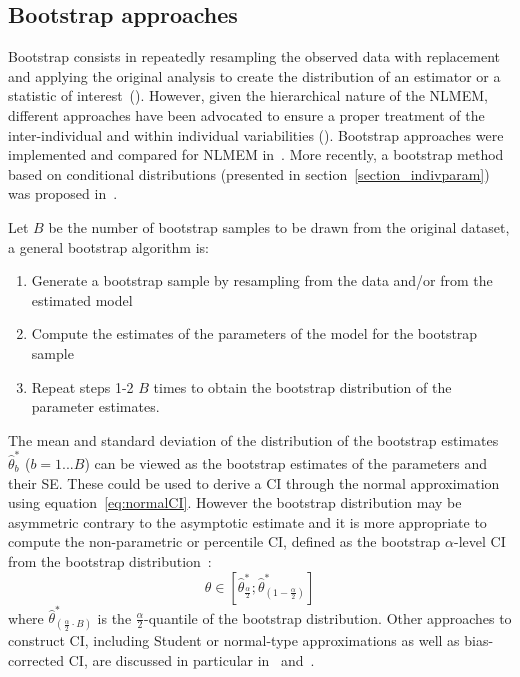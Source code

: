 \subsection{Bootstrap approaches} \label{sec:bootstrap} 

Bootstrap consists in repeatedly resampling the observed data with replacement and applying the original analysis to create the distribution of an estimator or a statistic of interest~(\cite{Efron79}). However, given the hierarchical nature of the NLMEM, different approaches have been advocated to ensure a proper treatment of the inter-individual and within individual variabilities (\cite{Das99}). Bootstrap approaches were implemented and compared for NLMEM in~\cite{Thai13}. More recently, a bootstrap method based on conditional distributions  (presented in section~\ref{section_indivparam}) was proposed in~\cite{Comets21bootstrap}.

Let $B$ be the number of bootstrap samples to be drawn from the original dataset, a general bootstrap algorithm is:
\begin{enumerate}
  \item Generate a bootstrap sample by resampling from the data and/or from the estimated model
  \item Compute the estimates of the parameters of the model for the bootstrap sample
  \item Repeat steps 1-2 $B$ times to obtain the bootstrap distribution of the parameter estimates.
\end{enumerate}
The mean and standard deviation of the distribution of the bootstrap estimates $\hat{\theta}_b^{*}$ ($b=1...B$) can be viewed as the bootstrap estimates of the parameters and their SE. These could be used to derive a CI through the normal approximation using equation~\ref{eq:normalCI}. However the bootstrap distribution may be asymmetric contrary to the asymptotic estimate and it is more appropriate to compute the non-parametric or percentile CI, defined as the bootstrap $\alpha$-level CI from the bootstrap distribution~\cite{Davison97}:
\begin{equation}
\label{eq:Boot_CI}
\theta \in \left[ \hat{\theta}^{*}_{\frac{\alpha}{2}}  ;\hat{\theta}^{*}_{(1-\frac{\alpha}{2})} \right]
\end{equation}
where $\hat{\theta}^{*}_{(\frac{\alpha}{2} \cdot B)}$ is the $\frac{\alpha}{2}$-quantile of the bootstrap distribution. Other approaches to construct CI, including Student or normal-type approximations as well as bias-corrected CI, are discussed in particular in~\cite{Davison97} and~\cite{McKinnon06}.


